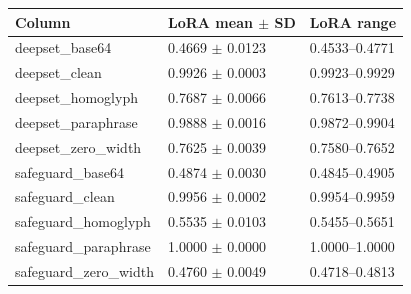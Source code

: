 \begin{tabular}{lll}
\toprule
Column & LoRA mean $\pm$ SD & LoRA range\\
\midrule
deepset\_base64 & 0.4669 $\pm$ 0.0123 & 0.4533--0.4771\\
deepset\_clean & 0.9926 $\pm$ 0.0003 & 0.9923--0.9929\\
deepset\_homoglyph & 0.7687 $\pm$ 0.0066 & 0.7613--0.7738\\
deepset\_paraphrase & 0.9888 $\pm$ 0.0016 & 0.9872--0.9904\\
deepset\_zero\_width & 0.7625 $\pm$ 0.0039 & 0.7580--0.7652\\
safeguard\_base64 & 0.4874 $\pm$ 0.0030 & 0.4845--0.4905\\
safeguard\_clean & 0.9956 $\pm$ 0.0002 & 0.9954--0.9959\\
safeguard\_homoglyph & 0.5535 $\pm$ 0.0103 & 0.5455--0.5651\\
safeguard\_paraphrase & 1.0000 $\pm$ 0.0000 & 1.0000--1.0000\\
safeguard\_zero\_width & 0.4760 $\pm$ 0.0049 & 0.4718--0.4813\\
\bottomrule\end{tabular}
